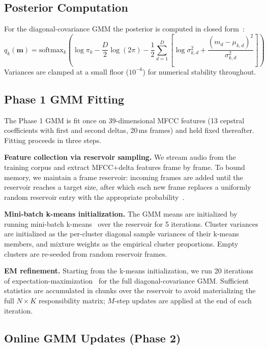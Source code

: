 \documentclass[9pt,twocolumn]{article}
\theoremstyle{plain}
\theoremstyle{definition}
\theoremstyle{remark}
\begin{document}
\subsection{Posterior Computation}

For the diagonal-covariance GMM the posterior is computed in closed form~\citep{bishop2006pattern}:
\begin{equation}
q_k(\mathbf{m}) = \text{softmax}_k\left(\log \pi_k - \frac{D}{2}\log(2\pi) - \frac{1}{2}\sum_{d=1}^{D}\left[\log \sigma_{k,d}^2 + \frac{(m_d - \mu_{k,d})^2}{\sigma_{k,d}^2}\right]\right)
\end{equation}
Variances are clamped at a small floor ($10^{-6}$) for numerical stability throughout.

\subsection{Phase 1 GMM Fitting}

The Phase 1 GMM is fit once on 39-dimensional MFCC features (13 cepstral coefficients with first and second deltas, 20\,ms frames) and held fixed thereafter. Fitting proceeds in three steps.

\textbf{Feature collection via reservoir sampling.} We stream audio from the training corpus and extract MFCC+delta features frame by frame. To bound memory, we maintain a frame reservoir: incoming frames are added until the reservoir reaches a target size, after which each new frame replaces a uniformly random reservoir entry with the appropriate probability~\citep{vitter1985reservoir}.

\textbf{Mini-batch k-means initialization.} The GMM means are initialized by running mini-batch k-means~\citep{macqueen1967kmeans} over the reservoir for 5 iterations. Cluster variances are initialized as the per-cluster diagonal sample variances of their k-means members, and mixture weights as the empirical cluster proportions. Empty clusters are re-seeded from random reservoir frames.

\textbf{EM refinement.} Starting from the k-means initialization, we run 20 iterations of expectation-maximization~\citep{dempster1977em} for the full diagonal-covariance GMM. Sufficient statistics are accumulated in chunks over the reservoir to avoid materializing the full $N \!\times\! K$ responsibility matrix; $M$-step updates are applied at the end of each iteration.

\subsection{Online GMM Updates (Phase 2)}
\end{document}
